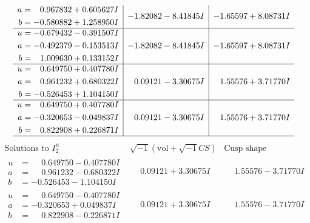 \documentclass[1p]{elsarticle_modified}
\theoremstyle{definition}
\newcommand{\I}{\sqrt{-1}}
\begin{document}
$$\begin{array}{c|c|c}
\begin{aligned}
a &= \phantom{-}0.967832 + 0.605627 I \\
b &= -0.580882 + 1.258950 I\end{aligned}
 & -1.82082 - 8.41845 I & -1.65597 + 8.08731 I \\ \hline\begin{aligned}
u &= -0.679432 - 0.391507 I \\
a &= -0.492379 - 0.153513 I \\
b &= \phantom{-}1.009630 + 0.133152 I\end{aligned}
 & -1.82082 - 8.41845 I & -1.65597 + 8.08731 I \\ \hline\begin{aligned}
u &= \phantom{-}0.649750 + 0.407780 I \\
a &= \phantom{-}0.961232 + 0.680322 I \\
b &= -0.526453 + 1.104150 I\end{aligned}
 & \phantom{-}0.09121 - 3.30675 I & \phantom{-}1.55576 + 3.71770 I \\ \hline\begin{aligned}
u &= \phantom{-}0.649750 + 0.407780 I \\
a &= -0.320653 - 0.049837 I \\
b &= \phantom{-}0.822908 + 0.226871 I\end{aligned}
 & \phantom{-}0.09121 - 3.30675 I & \phantom{-}1.55576 + 3.71770 I\\
 \hline 
 \end{array}$$\newpage$$\begin{array}{c|c|c}  
\text{Solutions to }I^u_{2}& \I (\text{vol} + \sqrt{-1}CS) & \text{Cusp shape}\\
 \hline 
\begin{aligned}
u &= \phantom{-}0.649750 - 0.407780 I \\
a &= \phantom{-}0.961232 - 0.680322 I \\
b &= -0.526453 - 1.104150 I\end{aligned}
 & \phantom{-}0.09121 + 3.30675 I & \phantom{-}1.55576 - 3.71770 I \\ \hline\begin{aligned}
u &= \phantom{-}0.649750 - 0.407780 I \\
a &= -0.320653 + 0.049837 I \\
b &= \phantom{-}0.822908 - 0.226871 I\end{aligned}
 & \phantom{-}0.09121 + 3.30675 I & \phantom{-}1.55576 - 3.71770 I \\ \hline\begin{aligned}

\end{aligned}
\end{array}$$
\end{document}
